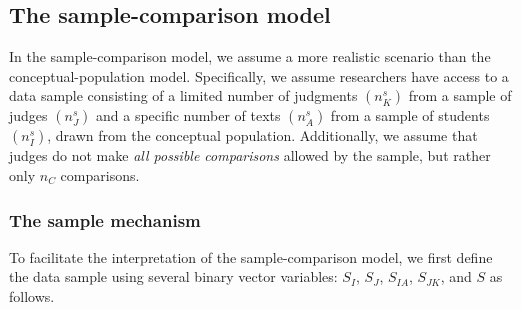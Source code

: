 \documentclass[
  authoryear,
  review,
  1p]{elsarticle}
\begin{document}
\subsection{The sample-comparison
model}\label{sec-theory-theoretical_SC}

In the sample-comparison model, we assume a more realistic scenario than
the conceptual-population model. Specifically, we assume researchers
have access to a data sample consisting of a limited number of judgments
\((n^{s}_{K})\) from a sample of judges \((n^{s}_{J})\) and a specific
number of texts \((n^{s}_{A})\) from a sample of students
\((n^{s}_{I})\), drawn from the conceptual population. Additionally, we
assume that judges do not make \emph{all possible comparisons} allowed
by the sample, but rather only \(n_{C}\) comparisons.

\subsubsection{The sample mechanism}\label{sec-theory-theoretical_SC1}

To facilitate the interpretation of the sample-comparison model, we
first define the data sample using several binary vector variables:
\(S_{I}\), \(S_{J}\), \(S_{IA}\), \(S_{JK}\), and \(S\) as follows.
\end{document}
